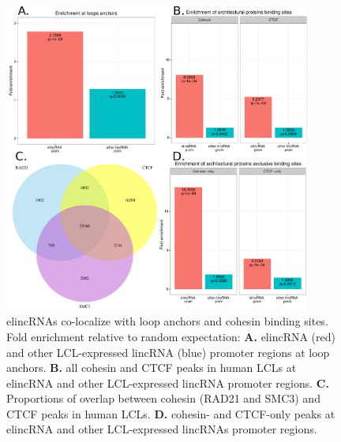 \documentclass[11pt,a4paper]{report}
\begin{document}
\begin{figure}[ht]
	\includegraphics[width=0.9\textwidth]{Figures/2_enrich_anchor_prot.pdf}
	\caption{elincRNAs co-localize with loop anchors and cohesin binding sites. Fold enrichment relative to random expectation: \textbf{A.} elincRNA (red) and other LCL-expressed lincRNA (blue) promoter regions at loop anchors. \textbf{B.} all cohesin and CTCF peaks in human LCLs at elincRNA and other LCL-expressed lincRNA promoter regions. \textbf{C.} Proportions of overlap between cohesin (RAD21 and SMC3) and CTCF peaks in human LCLs. \textbf{D.} cohesin- and CTCF-only peaks at elincRNA and other LCL-expressed lincRNAs promoter regions.}
	\label{enrich_elinc}
\end{figure}
\end{document}
